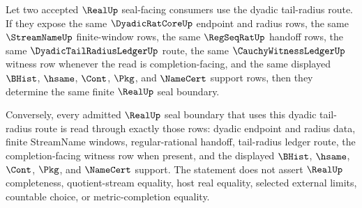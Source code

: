 \begin{theorem}
\label{thm:real-dyadic-tail-radius-seal-determinacy}
Let two accepted $\RealUp$ seal-facing consumers use the dyadic tail-radius
route. If they expose the same $\DyadicRatCoreUp$ endpoint and radius rows,
the same $\StreamNameUp$ finite-window rows, the same $\RegSeqRatUp$ handoff
rows, the same $\DyadicTailRadiusLedgerUp$ route, the same
$\CauchyWitnessLedgerUp$ witness row whenever the read is completion-facing,
and the same displayed $\BHist$, $\hsame$, $\Cont$, $\Pkg$, and $\NameCert$
support rows, then they determine the same finite $\RealUp$ seal boundary.

Conversely, every admitted $\RealUp$ seal boundary that uses this dyadic
tail-radius route is read through exactly those rows: dyadic endpoint and
radius data, finite StreamName windows, regular-rational handoff, tail-radius
ledger route, the completion-facing witness row when present, and the displayed
$\BHist$, $\hsame$, $\Cont$, $\Pkg$, and $\NameCert$ support. The statement
does not assert $\RealUp$ completeness, quotient-stream equality, host real
equality, selected external limits, countable choice, or metric-completion
equality.
\end{theorem}
